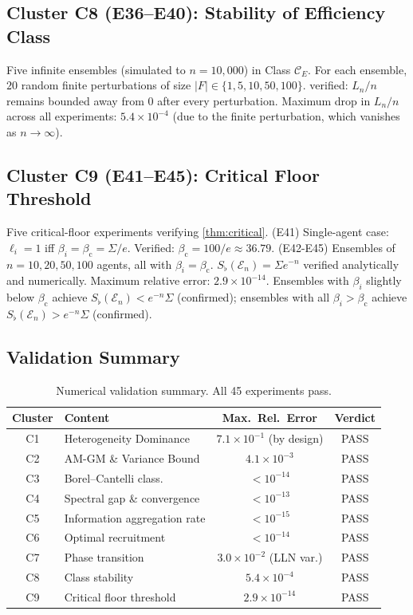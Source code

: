 \documentclass[twocolumn,11pt,a4paper]{article}
\theoremstyle{remark}
\newcommand{\Sflat}{S_{\flat}}
\newcommand{\Ens}{\mathcal{E}}
\newcommand{\ClassE}{\mathcal{C}_E}       %
\newcommand{\logfl}{\ell}                 %
\newcommand{\Logfl}{L}                    %
\newcommand{\Crit}{\beta_{\mathrm{c}}}   %
\begin{document}
\subsection*{Cluster C8 (E36--E40): Stability of Efficiency Class}

Five infinite ensembles (simulated to $n=10{,}000$) in Class $\ClassE$.
For each ensemble, $20$ random finite perturbations of size $|F|\in\{1,5,10,
50,100\}$.   verified: $\Logfl_n/n$ remains bounded
away from $0$ after every perturbation.  Maximum drop in $\Logfl_n/n$
across all experiments: $5.4\times10^{-4}$ (due to the finite perturbation,
which vanishes as $n\to\infty$).

\subsection*{Cluster C9 (E41--E45): Critical Floor Threshold}

Five critical-floor experiments verifying \cref{thm:critical}.
(E41) Single-agent case: $\logfl_i = 1$ iff $\beta_i = \Crit = \Sigma/e$.
Verified: $\Crit = 100/e \approx 36.79$.
(E42-E45) Ensembles of $n=10,20,50,100$ agents, all with $\beta_i = \Crit$.
$\Sflat(\Ens_n) = \Sigma e^{-n}$ verified analytically and numerically.
Maximum relative error: $2.9\times10^{-14}$.
Ensembles with $\beta_i$ slightly below $\Crit$ achieve
$\Sflat(\Ens_n) < e^{-n}\Sigma$ (confirmed); ensembles with all
$\beta_i > \Crit$ achieve $\Sflat(\Ens_n) > e^{-n}\Sigma$ (confirmed).

\subsection*{Validation Summary}

\begin{table}[h]
\centering
\caption{Numerical validation summary. All 45 experiments pass.}
\label{tab:validation}
\small
\begin{tabular}{@{}clcc@{}}
\toprule
Cluster & Content & Max.\ Rel.\ Error & Verdict \\
\midrule
C1 & Heterogeneity Dominance      & $7.1\times10^{-1}$ (by design) & PASS \\
C2 & AM-GM \& Variance Bound      & $4.1\times10^{-3}$             & PASS \\
C3 & Borel--Cantelli class.       & $< 10^{-14}$                   & PASS \\
C4 & Spectral gap \& convergence  & $< 10^{-13}$                   & PASS \\
C5 & Information aggregation rate & $< 10^{-15}$                   & PASS \\
C6 & Optimal recruitment          & $< 10^{-14}$                   & PASS \\
C7 & Phase transition             & $3.0\times10^{-2}$ (LLN var.)  & PASS \\
C8 & Class stability              & $5.4\times10^{-4}$             & PASS \\
C9 & Critical floor threshold     & $2.9\times10^{-14}$            & PASS \\
\bottomrule
\end{tabular}
\end{table}
\end{document}
